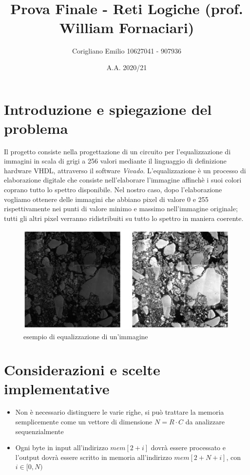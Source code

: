 \documentclass[11pt]{article} %
\title{Prova Finale - Reti Logiche (prof. William Fornaciari)}
\author{Corigliano Emilio 10627041 - 907936}
\date{A.A. 2020/21} %
\begin{document}
\maketitle

\section{Introduzione e spiegazione del problema}
Il progetto consiste nella progettazione di un circuito per l'equalizzazione di immagini in scala di grigi a 256 valori mediante il linguaggio di definizione hardware VHDL, attraverso il software \textit{Vivado}. L'equalizzazione è un processo di elaborazione digitale che consiste nell'elaborare l'immagine affinchè i suoi colori coprano tutto lo spettro disponibile. Nel nostro caso, dopo l'elaborazione vogliamo ottenere delle immagini che abbiano pixel di valore 0 e 255 rispettivamente nei punti di valore minimo e massimo nell'immagine originale; tutti gli altri pixel verranno ridistribuiti su tutto lo spettro in maniera coerente.

\begin{figure}[ht!]
\centering
\includegraphics[width=120mm]{esempio-di-equalizzazione.png}
\caption{esempio di equalizzazione di un'immagine}
\end{figure}

\section{Considerazioni e scelte implementative}

\begin{itemize}
\item Non è necessario distinguere le varie righe, si può trattare la memoria semplicemente come un vettore di dimensione $N = R \cdot C$ da analizzare sequenzialmente

\item Ogni byte in input all'indirizzo $mem[2+i]$ dovrà essere processato e l'output dovrà essere scritto in memoria all'indirizzo $mem[2+ N +i]$, con $i \in [0, N)$
\end{itemize}
\end{document}

